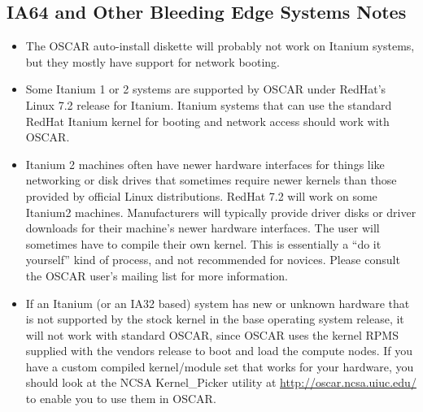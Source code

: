 
\subsection{IA64 and Other Bleeding Edge Systems Notes}
\label{subsec:ia64notes}

\begin{itemize}

\item The OSCAR auto-install diskette will probably not work on Itanium
  systems, but they mostly have support for network booting.
  
\item Some Itanium 1 or 2 systems are supported by OSCAR under
  RedHat's Linux 7.2 release for Itanium.  Itanium systems that can
  use the standard RedHat Itanium kernel for booting and network
  access should work with OSCAR.

\item Itanium 2 machines often have newer hardware interfaces for
	things like networking or disk drives that sometimes require newer
	kernels than those provided by official Linux distributions. RedHat 7.2
	will work on some Itanium2 machines. Manufacturers will typically
	provide driver disks or driver downloads for their machine's newer
	hardware interfaces. The user will sometimes have to compile their own
	kernel.  This is essentially a ``do it yourself'' kind
    of process, and not recommended for novices.  Please consult the
    OSCAR user's mailing list for more information.

\item If an Itanium (or an IA32 based) system has new or unknown
  hardware that is not supported by the stock kernel in the base
  operating system release, it will not work with standard OSCAR,
  since OSCAR uses the kernel RPMS supplied with the vendors release
  to boot and load the compute nodes.  If you have a custom compiled
  kernel/module set that works for your hardware, you should look at
  the NCSA Kernel\_Picker utility at \url{http://oscar.ncsa.uiuc.edu/} to
  enable you to use them in OSCAR.

\end{itemize}


